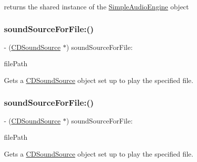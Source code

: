 returns the shared instance of the \hyperlink{interfaceSimpleAudioEngine}{Simple\+Audio\+Engine} object \mbox{\label{interfaceSimpleAudioEngine_a8ab8450895ef35d23744db31e5826d01}} 
\subsubsection{\texorpdfstring{sound\+Source\+For\+File\+:()}{soundSourceForFile:()}\hspace{0.1cm}{\footnotesize\ttfamily [1/4]}}
{\footnotesize\ttfamily -\/ (\hyperlink{interfaceCDSoundSource}{C\+D\+Sound\+Source} $\ast$) sound\+Source\+For\+File\+: \begin{DoxyParamCaption}\item[{(N\+S\+String $\ast$)}]{file\+Path }\end{DoxyParamCaption}}

Gets a \hyperlink{interfaceCDSoundSource}{C\+D\+Sound\+Source} object set up to play the specified file. \mbox{\label{interfaceSimpleAudioEngine_a8ab8450895ef35d23744db31e5826d01}} 
\subsubsection{\texorpdfstring{sound\+Source\+For\+File\+:()}{soundSourceForFile:()}\hspace{0.1cm}{\footnotesize\ttfamily [2/4]}}
{\footnotesize\ttfamily -\/ (\hyperlink{interfaceCDSoundSource}{C\+D\+Sound\+Source} $\ast$) sound\+Source\+For\+File\+: \begin{DoxyParamCaption}\item[{(N\+S\+String $\ast$)}]{file\+Path }\end{DoxyParamCaption}}

Gets a \hyperlink{interfaceCDSoundSource}{C\+D\+Sound\+Source} object set up to play the specified file. \mbox{\label{interfaceSimpleAudioEngine_a8ab8450895ef35d23744db31e5826d01}} 

